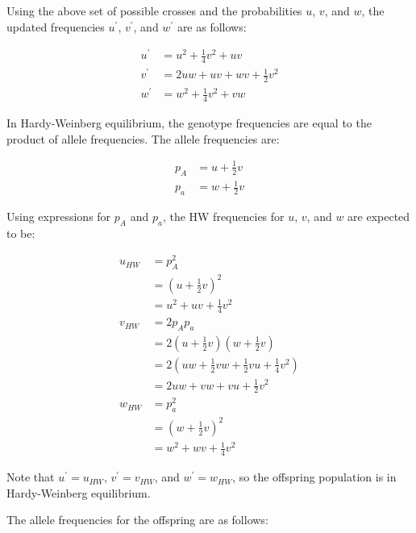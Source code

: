 \documentclass{essay}
\begin{document}
\begin{essaystyle}
Using the above set of possible crosses and the probabilities $u$, $v$, and
$w$, the updated frequencies $u^\prime$, $v^\prime$, and $w^\prime$ are as
follows:

\begin{align}
  u^\prime &= u^2 + \frac{1}{4}v^2 + uv \\
  v^\prime &= 2uw + uv + wv + \frac{1}{2}v^2 \\
  w^\prime &= w^2 + \frac{1}{4}v^2 + vw
\end{align}

In Hardy-Weinberg equilibrium, the genotype frequencies are equal to the
product of allele frequencies. The allele frequencies are:

\begin{align}
  p_A &= u + \frac{1}{2}v \\
  p_a &= w + \frac{1}{2}v
\end{align}

Using expressions for $p_A$ and $p_a$, the HW frequencies for $u$, $v$, and $w$ are expected to be:

\begin{align}
u_{HW} &= p_A^2 \\
  &= (u + \frac{1}{2}v)^2 \\
  &= u^2 + uv + \frac{1}{4}v^2 \\
  v_{HW} &= 2p_A p_a \\
  &= 2(u + \frac{1}{2}v)(w + \frac{1}{2}v) \\
  &= 2(uw + \frac{1}{2}vw + \frac{1}{2}vu + \frac{1}{4}v^2) \\
  &= 2uw + vw + vu + \frac{1}{2}v^2 \\
w_{HW} &= p_a^2 \\
  &= (w + \frac{1}{2}v)^2 \\
  &= w^2 + wv + \frac{1}{4}v^2
\end{align}

Note that $u^\prime = u_{HW}$, $v^\prime = v_{HW}$, and $w^\prime = w_{HW}$, so
the offspring population is in Hardy-Weinberg equilibrium.

The allele frequencies for the offspring are as follows:


\end{essaystyle}
\end{document}
